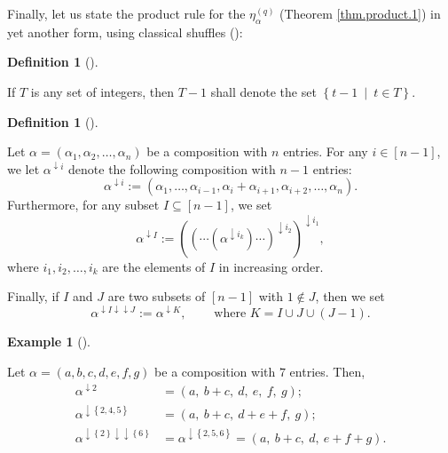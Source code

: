 \documentclass[numbers=enddot,12pt,final,onecolumn,notitlepage]{scrartcl}%
\theoremstyle{definition}
\newtheorem{defi}[theo]{Definition}
\newenvironment{definition}[1][]
{\begin{defi}[#1]\begin{leftbar}}
{\end{leftbar}\end{defi}}
\newtheorem{exam}[theo]{Example}
\newenvironment{example}[1][]
{\begin{exam}[#1]\begin{leftbar}}
{\end{leftbar}\end{exam}}
\begin{document}
Finally, let us state the product rule for the $\eta_{\alpha}^{\left(
q\right)  }$ (Theorem \ref{thm.product.1}) in yet another form, using
classical shuffles (\cite[Corollary 1]{GriVas22}):

\begin{definition}
If $T$ is any set of integers, then $T-1$ shall denote the set $\left\{
t-1\ \mid\ t\in T\right\}  $.
\end{definition}

\begin{definition}
Let $\alpha=\left(  \alpha_{1},\alpha_{2},\ldots,\alpha_{n}\right)  $ be a
composition with $n$ entries. For any $i\in\left[  n-1\right]  $, we let
$\alpha^{\downarrow i}$ denote the following composition with $n-1$ entries:
\[
\alpha^{\downarrow i}:=\left(  \alpha_{1},\dots,\alpha_{i-1},{\alpha
_{i}+\alpha_{i+1}},\alpha_{i+2},\dots,\alpha_{n}\right)  .
\]
Furthermore, for any subset $I\subseteq\left[  n-1 \right] $, we set
\[
\alpha^{\downarrow I}:=\left(  \left(  \cdots\left(  \alpha^{\downarrow i_{k}%
}\right)  \cdots\right)  ^{\downarrow i_{2}}\right)  ^{\downarrow i_{1}},
\]
where $i_{1},i_{2},\ldots,i_{k}$ are the elements of $I$ in increasing order.

Finally, if $I$ and $J$ are two subsets of $[n-1]$ with $1 \notin J$, then we
set
\[
\alpha^{\downarrow I\downarrow\downarrow J}:=\alpha^{\downarrow K}%
,\ \ \ \ \ \ \ \ \ \ \text{where }K=I\cup J\cup(J-1).
\]

\end{definition}

\begin{example}
Let $\alpha=\left(  a,b,c,d,e,f,g\right)  $ be a composition with $7$ entries.
Then,%
\begin{align*}
\alpha^{\downarrow2}  &  =\left(  a,\ b+c,\ d,\ e,\ f,\ g\right)  ;\\
\alpha^{\downarrow\left\{  2,4,5\right\}  }  &  =\left(
a,\ b+c,\ d+e+f,\ g\right)  ;\\
\alpha^{\downarrow\left\{  2\right\}  \downarrow\downarrow\left\{  6\right\}
}  &  =\alpha^{\downarrow\left\{  2,5,6\right\}  }=\left(
a,\ b+c,\ d,\ e+f+g\right)  .
\end{align*}

\end{example}
\end{document}
